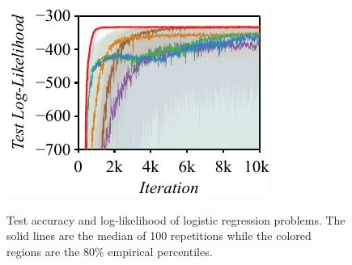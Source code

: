 \begin{figure}
{    \includegraphics[scale=0.80]{figures/pima_03.pdf}
  }
  \caption{Test accuracy and log-likelihood of logistic regression problems.
    The solid lines are the median of 100 repetitions while the colored regions are the 80\% empirical percentiles.
  }\label{fig:logistic}
  \vspace{-0.15in}
\end{figure}

\vspace{-0.1in}
